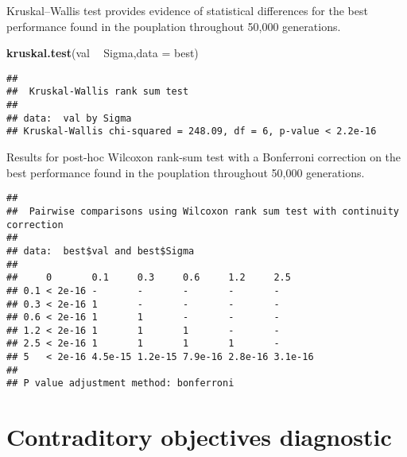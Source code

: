 \documentclass[]{book}
\newenvironment{Shaded}{\begin{snugshade}}{\end{snugshade}}
\newcommand{\DataTypeTok}[1]{\textcolor[rgb]{0.13,0.29,0.53}{#1}}
\newcommand{\KeywordTok}[1]{\textcolor[rgb]{0.13,0.29,0.53}{\textbf{#1}}}
\newcommand{\NormalTok}[1]{#1}
\newcommand{\OperatorTok}[1]{\textcolor[rgb]{0.81,0.36,0.00}{\textbf{#1}}}
\newcommand{\OtherTok}[1]{\textcolor[rgb]{0.56,0.35,0.01}{#1}}
\newcommand{\StringTok}[1]{\textcolor[rgb]{0.31,0.60,0.02}{#1}}
\begin{document}
Kruskal--Wallis test provides evidence of statistical differences for the best performance found in the pouplation throughout 50,000 generations.

\begin{Shaded}
\begin{Highlighting}[]
\KeywordTok{kruskal.test}\NormalTok{(val }\OperatorTok{~}\StringTok{ }\NormalTok{Sigma,}\DataTypeTok{data =}\NormalTok{ best)}
\end{Highlighting}
\end{Shaded}

\begin{verbatim}
## 
##  Kruskal-Wallis rank sum test
## 
## data:  val by Sigma
## Kruskal-Wallis chi-squared = 248.09, df = 6, p-value < 2.2e-16
\end{verbatim}

Results for post-hoc Wilcoxon rank-sum test with a Bonferroni correction on the best performance found in the pouplation throughout 50,000 generations.

\begin{Shaded}
\end{Shaded}

\begin{verbatim}
## 
##  Pairwise comparisons using Wilcoxon rank sum test with continuity correction 
## 
## data:  best$val and best$Sigma 
## 
##     0       0.1     0.3     0.6     1.2     2.5    
## 0.1 < 2e-16 -       -       -       -       -      
## 0.3 < 2e-16 1       -       -       -       -      
## 0.6 < 2e-16 1       1       -       -       -      
## 1.2 < 2e-16 1       1       1       -       -      
## 2.5 < 2e-16 1       1       1       1       -      
## 5   < 2e-16 4.5e-15 1.2e-15 7.9e-16 2.8e-16 3.1e-16
## 
## P value adjustment method: bonferroni
\end{verbatim}

\hypertarget{contraditory-objectives-diagnostic-2}{%
\section{Contraditory objectives diagnostic}\label{contraditory-objectives-diagnostic-2}}
\end{document}

